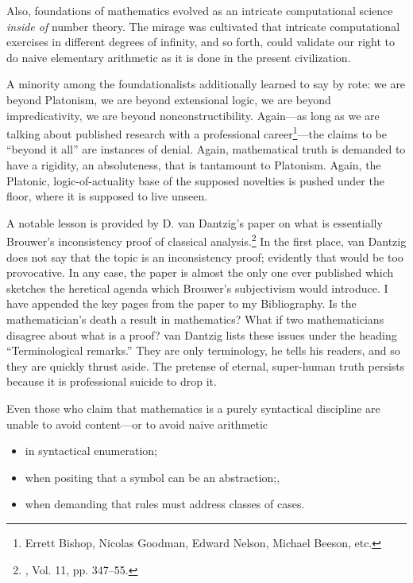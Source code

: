 Also, foundations of mathematics evolved as an intricate computational science \emph{inside of} number theory. The mirage was cultivated that intricate computational exercises in different degrees of infinity, and so forth, could validate our right to do naive elementary arithmetic as it is done in the present civilization.

A minority among the foundationalists additionally learned to say by rote: we are beyond Platonism, we are beyond extensional logic, we are beyond impredicativity, we are beyond nonconstructibility. Again---as long as we are talking about published research with a professional career\footnote{Errett Bishop, Nicolas Goodman, Edward Nelson, Michael Beeson, etc.}---the claims to be \enquote{beyond it all} are instances of denial. Again, mathematical truth is demanded to have a rigidity, an absoluteness, that is tantamount to Platonism. Again, the Platonic, logic-of-actuality base of the supposed novelties is pushed under the floor, where it is supposed to live unseen.

A notable lesson is provided by D. van Dantzig's paper on what is essentially Brouwer's inconsistency proof of classical analysis.\footnote{ , Vol. 11, pp. 347--55.} In the first place, van Dantzig does not say that the topic is an inconsistency proof; evidently that would be too provocative. In any case, the paper is almost the only one ever published which sketches the heretical agenda which Brouwer's subjectivism would introduce. I have appended the key pages from the paper to my Bibliography. Is the mathematician's death a result in mathematics? What if two mathematicians disagree about what is a proof? van Dantzig lists these issues under the heading \enquote{Terminological remarks.} They are only terminology, he tells his readers, and so they are quickly thrust aside. The pretense of eternal, super-human truth persists because it is professional suicide to drop it.

Even those who claim that mathematics is a purely syntactical discipline are unable to avoid content---or to avoid naive arithmetic
\begin{itemize}
\item in syntactical enumeration;
\item when positing that a symbol can be an abstraction;,
\item when demanding that rules must address classes of cases.
\end{itemize}

